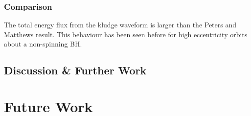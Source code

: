 \documentclass[a4paper, 11pt, titlepage, twoside]{report}
\begin{document}
\subsection{Comparison}


The total energy flux from the kludge waveform is larger than the Peters and Matthews result. This behaviour has been seen before for high eccentricity orbits about a non-spinning BH\cite{Gair2005}.

\section{Discussion \& Further Work}


















































\chapter{Future Work}

\newpage

\noindent

%
\noindent

\noindent
\end{document}
